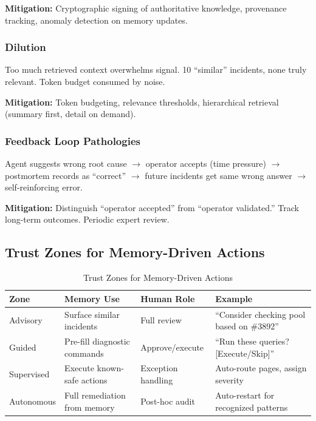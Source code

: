 \textbf{Mitigation:} Cryptographic signing of authoritative knowledge, provenance tracking, anomaly detection on memory updates.

\subsubsection{Dilution}

Too much retrieved context overwhelms signal. 10 ``similar'' incidents, none truly relevant. Token budget consumed by noise.

\textbf{Mitigation:} Token budgeting, relevance thresholds, hierarchical retrieval (summary first, detail on demand).

\subsubsection{Feedback Loop Pathologies}

Agent suggests wrong root cause $\rightarrow$ operator accepts (time pressure) $\rightarrow$ postmortem records as ``correct'' $\rightarrow$ future incidents get same wrong answer $\rightarrow$ self-reinforcing error.

\textbf{Mitigation:} Distinguish ``operator accepted'' from ``operator validated.'' Track long-term outcomes. Periodic expert review.

\subsection{Trust Zones for Memory-Driven Actions}
\label{subsec:trust-zones}

\begin{table}[htbp]
\centering
\caption{Trust Zones for Memory-Driven Actions}
\label{tab:trust-zones}
\begin{tabular}{llll}
\toprule
\textbf{Zone} & \textbf{Memory Use} & \textbf{Human Role} & \textbf{Example} \\
\midrule
Advisory & Surface similar incidents & Full review & ``Consider checking pool based on \#3892'' \\
Guided & Pre-fill diagnostic commands & Approve/execute & ``Run these queries? [Execute/Skip]'' \\
Supervised & Execute known-safe actions & Exception handling & Auto-route pages, assign severity \\
Autonomous & Full remediation from memory & Post-hoc audit & Auto-restart for recognized patterns \\
\bottomrule
\end{tabular}
\end{table}

